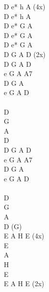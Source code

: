 \begin{chord}
\vin D e* h A (4x)\\
D e* h A\\
D e* G A\\
D e* G A\\
D e* G A\\

\vin D G A D (2x)\\
D G A D\\
e G A A7\\
D G A\\
e G A D\\

\vin \\
\vin D\\
\vin G\\
\vin A\\
\vin D\\

D G A D\\
e G A A7\\
D G A\\
e G A D\\

\vin \\
\vin D\\
\vin G\\
\vin A\\
\vin D (G)\\

E A H E (4x)\\
\vin E\\
\vin A\\
\vin H\\
\vin E\\
E A H E (2x)\\
\end{chord}
